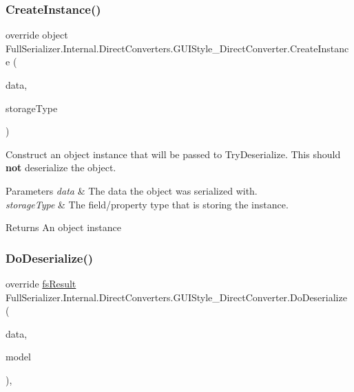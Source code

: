 \subsubsection{\texorpdfstring{Create\+Instance()}{CreateInstance()}}
{\footnotesize\ttfamily override object Full\+Serializer.\+Internal.\+Direct\+Converters.\+G\+U\+I\+Style\+\_\+\+Direct\+Converter.\+Create\+Instance (\begin{DoxyParamCaption}\item[{\hyperlink{class_full_serializer_1_1fs_data}{fs\+Data}}]{data,  }\item[{Type}]{storage\+Type }\end{DoxyParamCaption})\hspace{0.3cm}{\ttfamily [inline]}}



Construct an object instance that will be passed to Try\+Deserialize. This should {\bfseries not} deserialize the object. 


\begin{DoxyParams}{Parameters}
{\em data} & The data the object was serialized with.\\
\hline
{\em storage\+Type} & The field/property type that is storing the instance.\\
\hline
\end{DoxyParams}
\begin{DoxyReturn}{Returns}
An object instance
\end{DoxyReturn}
\mbox{\label{class_full_serializer_1_1_internal_1_1_direct_converters_1_1_g_u_i_style___direct_converter_a99d5f6622d24b284ce9a032f493ba1d2}} 
\subsubsection{\texorpdfstring{Do\+Deserialize()}{DoDeserialize()}}
{\footnotesize\ttfamily override \hyperlink{struct_full_serializer_1_1fs_result}{fs\+Result} Full\+Serializer.\+Internal.\+Direct\+Converters.\+G\+U\+I\+Style\+\_\+\+Direct\+Converter.\+Do\+Deserialize (\begin{DoxyParamCaption}\item[{Dictionary$<$ string, \hyperlink{class_full_serializer_1_1fs_data}{fs\+Data} $>$}]{data,  }\item[{ref G\+U\+I\+Style}]{model }\end{DoxyParamCaption})\hspace{0.3cm}{\ttfamily [inline]}, {\ttfamily [protected]}}



